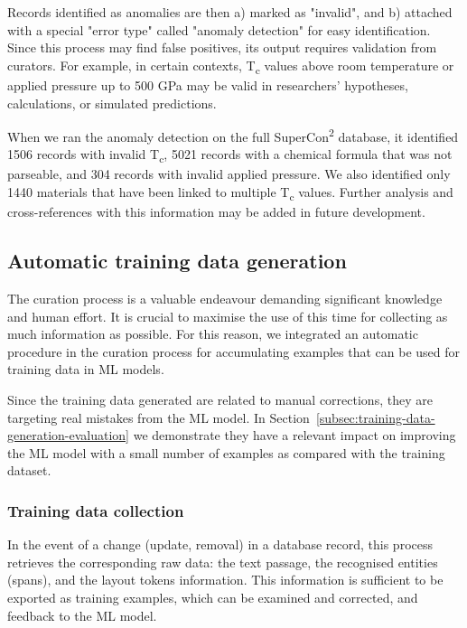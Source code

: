 \documentclass[a4paper]{article}
\begin{document}
Records identified as anomalies are then a) marked as "invalid", and b) attached with a special "error type" called "anomaly detection" for easy identification.
Since this process may find false positives, its output requires validation from curators. 
For example, in certain contexts, T\textsubscript{c} values above room temperature or applied pressure up to 500 GPa may be valid in researchers' hypotheses, calculations, or simulated predictions. 

When we ran the anomaly detection on the full SuperCon\textsuperscript{2} database, it identified 1506 records with invalid T\textsubscript{c}, 5021 records with a chemical formula that was not parseable, and 304 records with invalid applied pressure.  
We also identified only 1440 materials that have been linked to multiple T\textsubscript{c} values. Further analysis and cross-references with this information may be added in future development. 

\subsection{Automatic training data generation}
\label{subsec:feedback-loop-training-data}
The curation process is a valuable endeavour demanding significant knowledge and human effort. 
It is crucial to maximise the use of this time for collecting as much information as possible.
For this reason, we integrated an automatic procedure in the curation process for accumulating examples that can be used for training data in ML models. 

Since the training data generated are related to manual corrections, they are targeting real mistakes from the ML model. 
In Section~\ref{subsec:training-data-generation-evaluation} we demonstrate they have a relevant impact on improving the ML model with a small number of examples as compared with the training dataset. 

\subsubsection{Training data collection}
In the event of a change (update, removal) in a database record, this process retrieves the corresponding raw data: the text passage, the recognised entities (spans), and the layout tokens information. 
This information is sufficient to be exported as training examples, which can be examined and corrected, and feedback to the ML model. 
\end{document}
